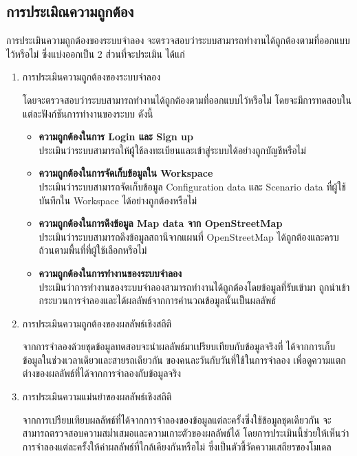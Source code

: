 \subsection{การประเมิณความถูกต้อง}
\begin{mypara}
    \indent การประเมินความถูกต้องของระบบจำลอง จะตรวจสอบว่าระบบสามารถทำงานได้ถูกต้องตามที่ออกแบบไว้หรือไม่
    ซึ่งแบ่งออกเป็น 2 ส่วนที่จะประเมิน ได้แก่
\end{mypara}
    \begin{enumerate}
        \item การประเมินความถูกต้องของระบบจำลอง
        \begin{mypara}
            \indent โดยจะตรวจสอบว่าระบบสามารถทำงานได้ถูกต้องตามที่ออกแบบไว้หรือไม่ โดยจะมีการทดสอบในแต่ละฟังก์ชันการทำงานของระบบ
            ดังนี้
            \begin{itemize}
                \item \textbf{ความถูกต้องในการ Login และ Sign up}
                    \\ ประเมินว่าระบบสามารถให้ผู้ใช้ลงทะเบียนและเข้าสู่ระบบได้อย่างถูกบัญชีหรือไม่
                \item \textbf{ความถูกต้องในการจัดเก็บข้อมูลใน Workspace}
                    \\ ประเมินว่าระบบสามารถจัดเก็บข้อมูล Configuration data และ Scenario data ที่ผู้ใช้บันทึกใน Workspace ได้อย่างถูกต้องหรือไม่ 
                \item \textbf{ความถูกต้องในการดึงข้อมูล Map data จาก OpenStreetMap}
                    \\ ประเมินว่าระบบสามารถดึงข้อมูลสถานีจากแผนที่ OpenStreetMap ได้ถูกต้องและครบถ้วนตามพื้นที่ที่ผู้ใช้เลือกหรือไม่
                \item \textbf{ความถูกต้องในการทำงานของระบบจำลอง}
                    \\ ประเมินว่าการทำงานของระบบจำลองสามารถทำงานได้ถูกต้องโดยข้อมูลที่รับเข้ามา
                    ถูกนำเข้ากระบวนการจำลองและได้ผลลัพธ์จากการคำนวณข้อมูลนั้นเป็นผลลัพธ์
            \end{itemize}
        \end{mypara}
        \item การประเมินความถูกต้องของผลลัพธ์เชิงสถิติ
        \begin{mypara}
            \indent จากการจำลองด้วยชุดข้อมูลทดสอบจะนำผลลัพธ์มาเปรียบเทียบกับข้อมูลจริงที่
            ได้จากการเก็บข้อมูลในช่วงเวลาเดียวและสายรถเดียวกัน ของคนละวันกับวันที่ใช้ในการจำลอง
            เพื่อดูความแตกต่างของผลลัพธ์ที่ได้จากการจำลองกับข้อมูลจริง
        \end{mypara}
        \item การประเมินความแม่นยำของผลลัพธ์เชิงสถิติ
        \begin{mypara}
            \indent จากการเปรียบเทียบผลลัพธ์ที่ได้จากการจำลองของข้อมูลแต่ละครั้งซึ่งใช้ข้อมูลชุดเดียวกัน 
            จะสามารถตรวจสอบความสม่ำเสมอและความเกาะตัวของผลลัพธ์ได้ โดยการประเมินนี้ช่วยให้เห็นว่า 
            การจำลองแต่ละครั้งให้ค่าผลลัพธ์ที่ใกล้เคียงกันหรือไม่ ซึ่งเป็นตัวชี้วัดความเสถียรของโมเดล 
        \end{mypara}
    \end{enumerate}

